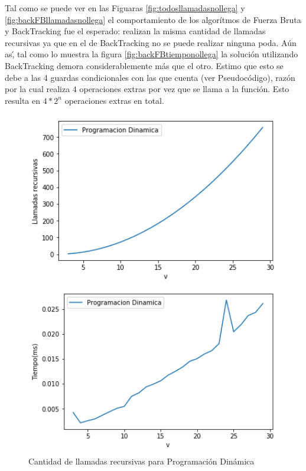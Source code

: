 \par Tal como se puede ver en las Figuaras \ref{fig:todosllamadasnollega} y \ref{fig:backFBllamadasnollega}
el comportamiento de los algor\'itmos de Fuerza Bruta y BackTracking fue el esperado: realizan la misma cantidad 
de llamadas recursivas ya que en el de BackTracking no se puede realizar ninguna poda. A\'un as\', tal como
lo muestra la figura \ref{fig:backFBtiemponollega} la soluci\'on utilizando BackTracking demora considerablemente
m\'as que el otro. Estimo que esto se debe a las 4 guardas condicionales con las que cuenta (ver Pseudoc\'odigo),
raz\'on por la cual realiza $4$ operaciones extras por vez que se llama a la funci\'on. Esto resulta en $4*2^n$ 
operaciones extras en total.

\begin{figure}[H] 
    \centering
    \begin{minipage}{0.45\textwidth}
        \centering
        \includegraphics[width=1\textwidth]{img/nollega/dinamicallamadas.png} %
        \caption{Cantidad de llamadas recursivas para Programaci\'on Din\'amica}
        \label{fig:dinamicallamadasnollega} 
    \end{minipage}\hfill
    \begin{minipage}{0.45\textwidth}
        \centering
        \includegraphics[width=1\textwidth]{img/nollega/dinamicatiempo.png} %

\end{minipage}
\end{figure}
